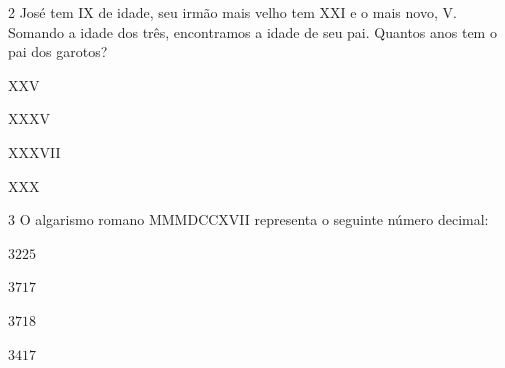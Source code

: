 


\num{2}  José tem IX de idade, seu irmão mais velho tem XXI e o mais novo, V.
Somando a idade dos três, encontramos a idade de seu pai. Quantos anos
tem o pai dos garotos?

\begin{escolha}
\item XXV
\item XXXV
\item XXXVII
\item XXX
\end{escolha}




\num{3}  O algarismo romano MMMDCCXVII representa o seguinte número decimal:

\begin{escolha}
\item $3225$
\item $3717$
\item $3718$
\item $3417$
\end{escolha}


